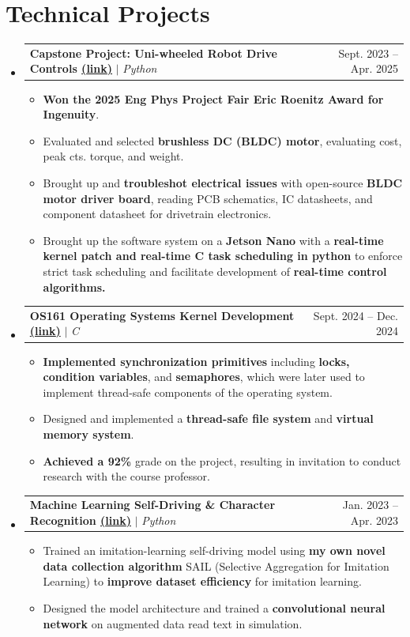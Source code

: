 \documentclass[letterpaper,11pt]{article}
\makeatletter
\newcommand{\resumeItem}[1]{
  \item\small{
    {#1 \vspace{-2pt}}
  }
}
\newcommand{\resumeProjectHeading}[2]{
    \item
    \begin{tabular*}{0.97\textwidth}{l@{\extracolsep{\fill}}r}
      \small#1 & #2 \\
    \end{tabular*}\vspace{-7pt}
}
\newcommand{\resumeSubHeadingListStart}{\begin{itemize}[leftmargin=0in, label={}]}
\newcommand{\resumeSubHeadingListEnd}{\end{itemize}}
\newcommand{\resumeItemListStart}{\begin{itemize}}
\newcommand{\resumeItemListEnd}{\end{itemize}\vspace{-5pt}}
\makeatother
\begin{document}
\section{Technical Projects}
    \resumeSubHeadingListStart
        \resumeProjectHeading
          {\textbf{Capstone Project: Uni-wheeled Robot Drive Controls \href{https://1mackenziekyle.github.io/learning-to-balance.html}{(\underline{link})}}
          $|$ \emph{Python}
          }{Sept. 2023 -- Apr. 2025}
          \resumeItemListStart
            \resumeItem{\textbf{Won the 2025 Eng Phys Project Fair Eric Roenitz Award for Ingenuity}.}
            \resumeItem{Evaluated and selected \textbf{brushless DC (BLDC) motor}, evaluating cost, peak cts. torque, and weight.}
            \resumeItem{Brought up and \textbf{troubleshot electrical issues} with open-source \textbf{BLDC motor driver board}, reading PCB schematics, IC datasheets, and component datasheet for drivetrain electronics.}
            \resumeItem{Brought up the software system on a \textbf{Jetson Nano} with a \textbf{real-time kernel patch and real-time C task scheduling in python} to enforce strict task scheduling and facilitate development of \textbf{real-time control algorithms.}}
          \resumeItemListEnd
      \resumeProjectHeading
          {\textbf{OS161 Operating Systems Kernel Development \href{https://1mackenziekyle.github.io/os.html}{(\underline{link})}}
          $|$ \emph{C}
          }{Sept. 2024 -- Dec. 2024}
          \resumeItemListStart
            \resumeItem{\textbf{Implemented synchronization primitives} including \textbf{locks, condition variables}, and \textbf{semaphores}, 
            which were later used to implement thread-safe components of the operating system.}
            \resumeItem{Designed and implemented a \textbf{thread-safe file system} and \textbf{virtual memory system}.}
            \resumeItem{\textbf{Achieved a 92\%} grade on the project, resulting in invitation to conduct research with the course professor.}
          \resumeItemListEnd
        \resumeProjectHeading
          {\textbf{Machine Learning Self-Driving \& Character Recognition \href{https://1mackenziekyle.github.io/machine-learning.html}{(\underline{link})}}
          $|$ \emph{Python}
          }{Jan. 2023 -- Apr. 2023}
          \resumeItemListStart
            \resumeItem{Trained an imitation-learning self-driving model using \textbf{my own novel data collection algorithm} SAIL (Selective Aggregation for Imitation Learning) to \textbf{improve dataset efficiency} for imitation learning.}
            \resumeItem{Designed the model architecture and trained a \textbf{convolutional neural network} on augmented data read text in simulation.}
          \resumeItemListEnd
    \resumeSubHeadingListEnd
\end{document}
